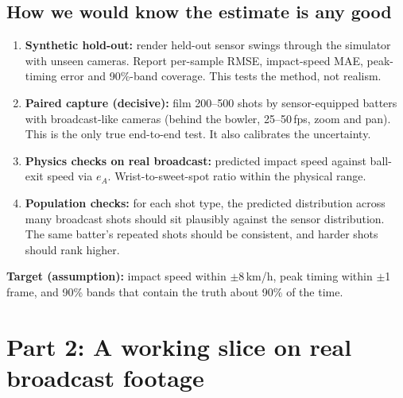 \documentclass[11pt,a4paper]{article}
\begin{document}
\subsection{How we would know the estimate is any good}
\begin{enumerate}[label=\textbf{V\arabic*}]
  \item \textbf{Synthetic hold-out:} render held-out sensor swings through the simulator with unseen cameras. Report per-sample RMSE, impact-speed MAE, peak-timing error and 90\%-band coverage. This tests the method, not realism.
  \item \textbf{Paired capture (decisive):} film 200--500 shots by sensor-equipped batters with broadcast-like cameras (behind the bowler, 25--50\,fps, zoom and pan). This is the only true end-to-end test. It also calibrates the uncertainty.
  \item \textbf{Physics checks on real broadcast:} predicted impact speed against ball-exit speed via $e_A$. Wrist-to-sweet-spot ratio within the physical range.
  \item \textbf{Population checks:} for each shot type, the predicted distribution across many broadcast shots should sit plausibly against the sensor distribution. The same batter's repeated shots should be consistent, and harder shots should rank higher.
\end{enumerate}
\textbf{Target (assumption):} impact speed within $\pm$8\,km/h, peak timing within $\pm$1 frame, and 90\% bands that contain the truth about 90\% of the time.

\newpage
\section{Part 2: A working slice on real broadcast footage}
\end{document}
